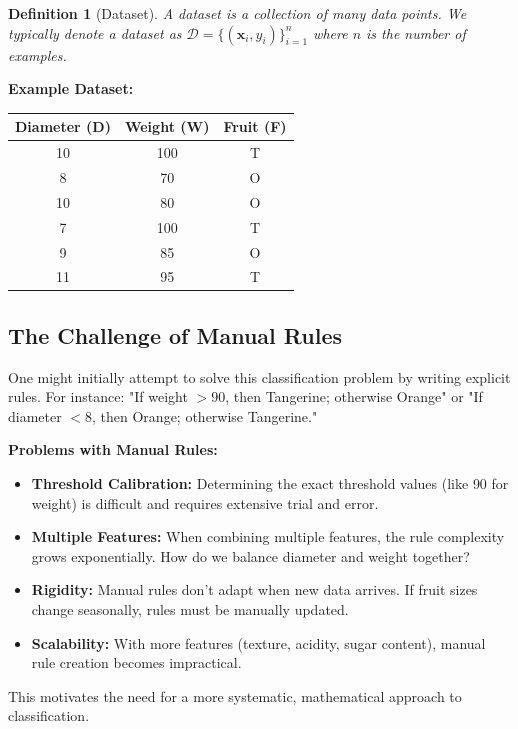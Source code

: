 \documentclass[12pt,a4paper]{article}
\theoremstyle{directpoint}
\newtheorem*{definition}{Definition}
\theoremstyle{definition}
\begin{document}
\begin{definition}[Dataset]
A dataset is a collection of many data points. We typically denote a dataset as $\mathcal{D} = \{(\mathbf{x}_i, y_i)\}_{i=1}^{n}$ where $n$ is the number of examples.
\end{definition}

\textbf{Example Dataset:}

\begin{center}
\begin{tabular}{|c|c|c|}
\hline
\textbf{Diameter (D)} & \textbf{Weight (W)} & \textbf{Fruit (F)} \\
\hline
10 & 100 & T \\
8 & 70 & O \\
10 & 80 & O \\
7 & 100 & T \\
9 & 85 & O \\
11 & 95 & T \\
\hline
\end{tabular}
\end{center}

\subsection{The Challenge of Manual Rules}

One might initially attempt to solve this classification problem by writing explicit rules. For instance: "If weight $> 90$, then Tangerine; otherwise Orange" or "If diameter $< 8$, then Orange; otherwise Tangerine."

\textbf{Problems with Manual Rules:}
\begin{itemize}
    \item \textbf{Threshold Calibration:} Determining the exact threshold values (like 90 for weight) is difficult and requires extensive trial and error.
    \item \textbf{Multiple Features:} When combining multiple features, the rule complexity grows exponentially. How do we balance diameter and weight together?
    \item \textbf{Rigidity:} Manual rules don't adapt when new data arrives. If fruit sizes change seasonally, rules must be manually updated.
    \item \textbf{Scalability:} With more features (texture, acidity, sugar content), manual rule creation becomes impractical.
\end{itemize}

This motivates the need for a more systematic, mathematical approach to classification.
\end{document}
